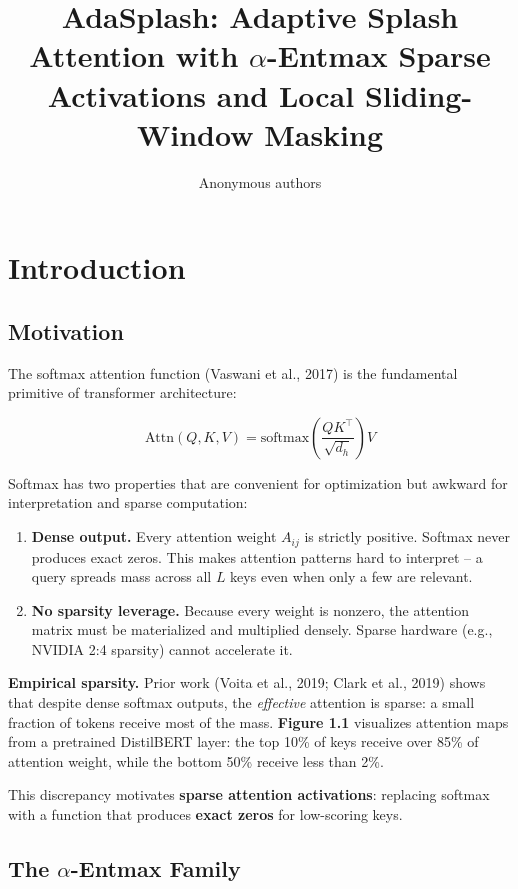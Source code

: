 \title{\textbf{AdaSplash: Adaptive Splash Attention with $\alpha$-Entmax Sparse Activations and Local Sliding-Window Masking}}

\author{Anonymous authors}



\section{Introduction}

\subsection{Motivation}

The softmax attention function (Vaswani et al., 2017) is the fundamental 
primitive of transformer architecture:

\[
\text{Attn}(Q, K, V) = \text{softmax}\!\left(\frac{Q K^\top}{\sqrt{d_h}}\right) V
\tag{1.1}
\]

Softmax has two properties that are convenient for optimization but awkward 
for interpretation and sparse computation:

\begin{enumerate}
\item \textbf{Dense output.} Every attention weight $A_{ij}$ is strictly positive.
  Softmax never produces exact zeros. This makes attention patterns hard
  to interpret -- a query spreads mass across all $L$ keys even when only
  a few are relevant.

\item \textbf{No sparsity leverage.} Because every weight is nonzero, the attention
  matrix must be materialized and multiplied densely. Sparse hardware
  (e.g., NVIDIA 2:4 sparsity) cannot accelerate it.

\end{enumerate}
\textbf{Empirical sparsity.} Prior work (Voita et al., 2019; Clark et al., 2019) 
shows that despite dense softmax outputs, the \textit{effective} attention is sparse: 
a small fraction of tokens receive most of the mass. \textbf{Figure 1.1} visualizes 
attention maps from a pretrained DistilBERT layer: the top 10\% of keys receive 
over 85\% of attention weight, while the bottom 50\% receive less than 2\%.

This discrepancy motivates \textbf{sparse attention activations}: replacing softmax 
with a function that produces \textbf{exact zeros} for low-scoring keys.

\subsection{The $\alpha$-Entmax Family}

